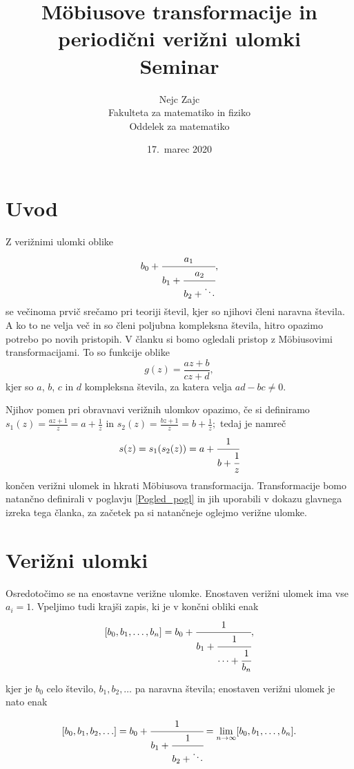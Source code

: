 \documentclass[a4paper,12pt]{article}
\title{M\"obiusove transformacije in periodični verižni ulomki \\ 
\Large Seminar}
\author{Nejc Zajc \\
Fakulteta za matematiko in fiziko \\
Oddelek za matematiko}
\date{17.\ marec 2020}
\begin{document}


\maketitle



\section{Uvod}

Z verižnimi ulomki oblike
\[
    b_0 + \cfrac{a_1}{b_1 + \cfrac{a_2}{b_2 + \ddots}},
\]
se večinoma prvič srečamo pri teoriji števil, kjer so njihovi členi naravna števila. A ko to ne velja več in so členi poljubna kompleksna števila, hitro opazimo potrebo po novih pristopih. V članku si bomo ogledali pristop z M\"obiusovimi transformacijami. To so funkcije oblike 
\begin{equation}
\label{Mob_def}
    g(z) = \frac{az + b}{cz + d},
\end{equation}
kjer so $a$, $b$, $c$ in $d$ kompleksna števila, za katera velja $ad - bc \neq 0.$

Njihov pomen pri obravnavi verižnih ulomkov opazimo, če si definiramo $s_1(z) = \frac{az + 1}{z} = a + \frac{1}{z}$ in $s_2(z) = \frac{bz + 1}{z} = b + \frac{1}{z};$ tedaj je namreč
\[
    s(z) = s_1(s_2(z)) = a + \cfrac{1}{b + \cfrac{1}{z}}  
\]
končen verižni ulomek in hkrati M\"obiusova transformacija. Transformacije bomo natančno definirali v poglavju \ref{Pogled_pogl} in jih uporabili v dokazu glavnega izreka tega članka, za začetek pa si natančneje oglejmo verižne ulomke.


\section{Verižni ulomki}

Osredotočimo se na enostavne verižne ulomke. Enostaven verižni ulomek ima vse $a_i = 1$. Vpeljimo tudi krajši zapis, ki je v končni obliki enak
\[
    [b_0, b_1, \ldots, b_n] = b_0 + \cfrac{1}{b_1 + \cfrac{1}{\cdots + \cfrac{1}{b_n}}},
\]

kjer je $b_0$ celo število, $b_1, b_2, \ldots$ pa naravna števila; enostaven verižni ulomek je nato enak

\begin{equation}
\label{Ver_def}
    [b_0, b_1, b_2, \ldots] = b_0 + \cfrac{1}{b_1 + \cfrac{1}{b_2 + \ddots}} = \lim_{n \to \infty} [b_0, b_1, \ldots, b_n].
\end{equation}
\end{document}
